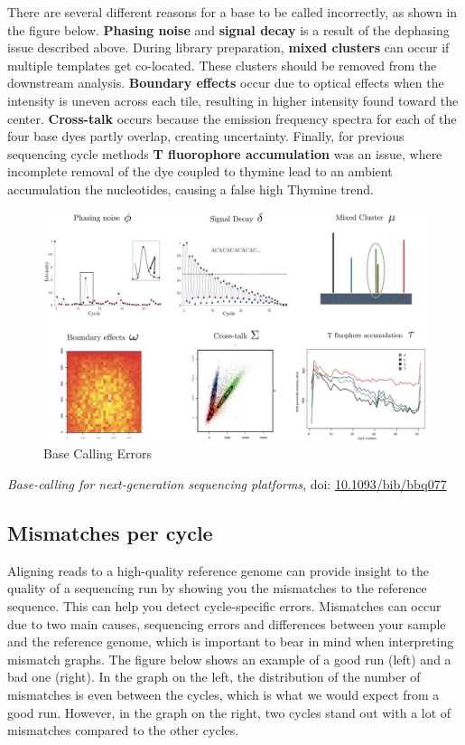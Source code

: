 \documentclass[11pt]{article}
\begin{document}
There are several different reasons for a base to be called incorrectly,
as shown in the figure below. \textbf{Phasing noise} and \textbf{signal
decay} is a result of the dephasing issue described above. During
library preparation, \textbf{mixed clusters} can occur if multiple
templates get co-located. These clusters should be removed from the
downstream analysis. \textbf{Boundary effects} occur due to optical
effects when the intensity is uneven across each tile, resulting in
higher intensity found toward the center. \textbf{Cross-talk} occurs
because the emission frequency spectra for each of the four base dyes
partly overlap, creating uncertainty. Finally, for previous sequencing
cycle methods \textbf{T fluorophore accumulation} was an issue, where
incomplete removal of the dye coupled to thymine lead to an ambient
accumulation the nucleotides, causing a false high Thymine trend.

    \begin{figure}
\centering
\includegraphics{img/base_calling_errors.jpg}
\caption{Base Calling Errors}
\end{figure}

    \textit{Base-calling for next-generation sequencing platforms}, doi:
\href{https://academic.oup.com/bib/article/12/5/489/268399}{10.1093/bib/bbq077}

\hypertarget{mismatches-per-cycle}{%
\subsection{Mismatches per cycle}\label{mismatches-per-cycle}}

Aligning reads to a high-quality reference genome can provide insight to
the quality of a sequencing run by showing you the mismatches to the
reference sequence. This can help you detect cycle-specific errors.
Mismatches can occur due to two main causes, sequencing errors and
differences between your sample and the reference genome, which is
important to bear in mind when interpreting mismatch graphs. The figure
below shows an example of a good run (left) and a bad one (right). In
the graph on the left, the distribution of the number of mismatches is
even between the cycles, which is what we would expect from a good run.
However, in the graph on the right, two cycles stand out with a lot of
mismatches compared to the other cycles.
\end{document}
